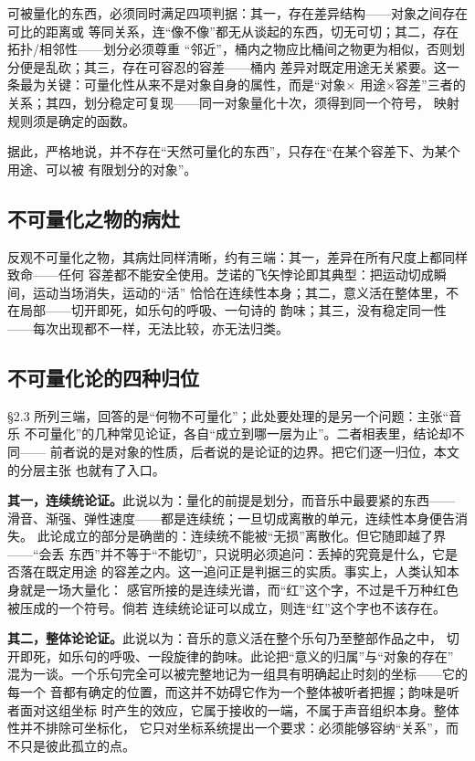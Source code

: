 \documentclass[11pt,a4paper,fontset=none]{ctexart}
\begin{document}
可被量化的东西，必须同时满足四项判据：其一，存在差异结构——对象之间存在可比的距离或
等同关系，连“像不像”都无从谈起的东西，切无可切；其二，存在拓扑/相邻性——划分必须尊重
“邻近”，桶内之物应比桶间之物更为相似，否则划分便是乱砍；其三，存在可容忍的容差——桶内
差异对既定用途无关紧要。这一条最为关键：可量化性从来不是对象自身的属性，而是“对象×
用途×容差”三者的关系；其四，划分稳定可复现——同一对象量化十次，须得到同一个符号，
映射规则须是确定的函数。

据此，严格地说，并不存在“天然可量化的东西”，只存在“在某个容差下、为某个用途、可以被
有限划分的对象”。

\subsection{不可量化之物的病灶}

反观不可量化之物，其病灶同样清晰，约有三端：其一，差异在所有尺度上都同样致命——任何
容差都不能安全使用。芝诺的飞矢悖论即其典型：把运动切成瞬间，运动当场消失，运动的“活”
恰恰在连续性本身；其二，意义活在整体里，不在局部——切开即死，如乐句的呼吸、一句诗的
韵味；其三，没有稳定同一性——每次出现都不一样，无法比较，亦无法归类。

\subsection{不可量化论的四种归位}

§2.3 所列三端，回答的是“何物不可量化”；此处要处理的是另一个问题：主张“音乐
不可量化”的几种常见论证，各自“成立到哪一层为止”。二者相表里，结论却不同——
前者说的是对象的性质，后者说的是论证的边界。把它们逐一归位，本文的分层主张
也就有了入口。

\textbf{其一，连续统论证。}此说以为：量化的前提是划分，而音乐中最要紧的东西——
滑音、渐强、弹性速度——都是连续统；一旦切成离散的单元，连续性本身便告消失。
此论成立的部分是确凿的：连续统不能被“无损”离散化。但它随即越了界——“会丢
东西”并不等于“不能切”，只说明必须追问：丢掉的究竟是什么，它是否落在既定用途
的容差之内。这一追问正是判据三的实质。事实上，人类认知本身就是一场大量化：
感官所接的是连续光谱，而“红”这个字，不过是千万种红色被压成的一个符号。倘若
连续统论证可以成立，则连“红”这个字也不该存在。

\textbf{其二，整体论论证。}此说以为：音乐的意义活在整个乐句乃至整部作品之中，
切开即死，如乐句的呼吸、一段旋律的韵味。此论把“意义的归属”与“对象的存在”
混为一谈。一个乐句完全可以被完整地记为一组具有明确起止时刻的坐标——它的每一个
音都有确定的位置，而这并不妨碍它作为一个整体被听者把握；韵味是听者面对这组坐标
时产生的效应，它属于接收的一端，不属于声音组织本身。整体性并不排除可坐标化，
它只对坐标系统提出一个要求：必须能够容纳“关系”，而不只是彼此孤立的点。
\end{document}
